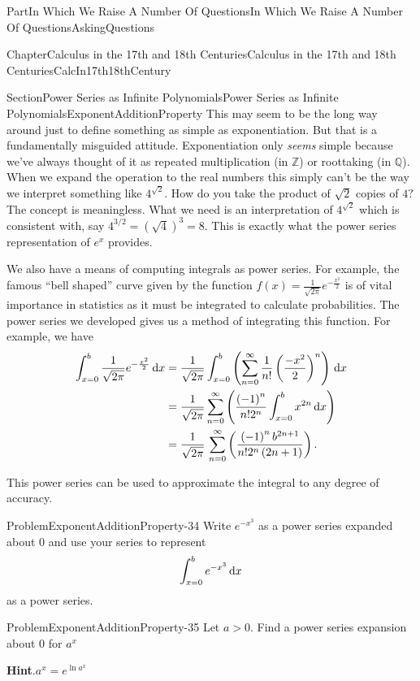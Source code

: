 \documentclass[oneside,10pt,]{book}
\newcommand{\blocktitlefont}{\relax}
\numberwithin{equation}{part}
\newcommand{\dx}[1]{\,{\rm d}#1}
\newcommand{\QQ}{\mathbb {Q}}
\newcommand{\ZZ}{\mathbb {Z}}
\newcommand{\amp}{&}
\begin{document}
\begin{partptx}{Part}{In Which We Raise A Number Of Questions}{}{In Which We Raise A Number Of Questions}{}{}{AskingQuestions}
\begin{chapterptx}{Chapter}{Calculus in the 17th and 18th Centuries}{}{Calculus in the 17th and 18th Centuries}{}{}{CalcIn17th18thCentury}
\begin{sectionptx}{Section}{Power Series as Infinite Polynomials}{}{Power Series as Infinite Polynomials}{}{}{ExponentAdditionProperty}
This may seem to be the long way around just to define something as simple as exponentiation.  But that is a fundamentally misguided attitude.  Exponentiation only \emph{seems} simple because we've always thought of it as repeated multiplication (in \(\ZZ\)) or root\textendash{}taking (in \(\QQ\)).  When we expand the operation to the real numbers this simply can't be the way we interpret something like \(4^{\sqrt{2}}\).  How do you take the product of \(\sqrt{2}\) copies of \(4?\) The concept is meaningless.  What we need is an interpretation of \(4^{\sqrt{2}}\) which is consistent with, say \(4^{3/2}
= \left(\sqrt{4}\right)^3=8\).  This is exactly what the power series representation of \(e^x\) provides.%
\par
We also have a means of computing integrals as power series.  For example, the famous ``bell shaped'' curve given by the function \(f(x)=\frac{1}{\sqrt{2\pi}}e^{-\frac{x^2}{2}}\) is of vital importance in statistics as it must be integrated to calculate probabilities.  The power series we developed gives us a method of integrating this function.  For example, we have%
\begin{align*}
\int_{x=0}^b\frac{1}{\sqrt{2\pi}}
e^{-\frac{x^2}{2}}\dx{x} \amp =\frac{1}{\sqrt{2\pi}}
\int_{x=0}^b \left(\sum_{n=0}^\infty
\frac{1}{n!}\left(\frac{-x^2}{2}\right)^n\right)\dx{x}\\
\amp = \frac{1}{\sqrt{2\pi}} \sum_{n=0}^\infty
\left(
\frac{\left(-1\right)^n}{n!2^n}\int_{x=0}^bx^{2n}\dx{x}
\right)\\
\amp =\frac{1}{\sqrt{2\pi}}\,\sum_{n=0}^\infty\left(\frac{\left(-1\right)^nb^{2n+1}}{n!2^n\left(2n+1\right)}\right)\text{.}
\end{align*}
%
\par
This power series can be used to approximate the integral to any degree of accuracy.%
\begin{problem}{Problem}{}{ExponentAdditionProperty-34}%
Write \(e^{-x^3}\) as a power series expanded about \(0\) and use your series to represent%
\begin{equation*}
\int^b_{x=0}{e^{-x^3}\dx{x}}
\end{equation*}
as a power series.%
\end{problem}
\begin{problem}{Problem}{}{ExponentAdditionProperty-35}%
Let \(a>0\).  Find a power series expansion about 0 for \(a^x\)%
\par\smallskip%
\noindent\textbf{\blocktitlefont Hint}.\hypertarget{ExponentAdditionProperty-35-2}{}\quad{}\(a^x=e^{\ln a^x }\)%

\end{problem}
\end{sectionptx}
\end{chapterptx}
\end{partptx}
\end{document}
